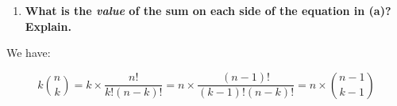 \documentclass[10pt]{article}
\begin{document}
\begin{enumerate}
\begin{enumerate}
\begin{proof}
Then we have $\binom{n}{k} = 0$ with $k > n$, so we can conclude that:

\begin{align*}
      2\binom{n}{2} +  4\binom{n}{4} + \ldots + (n-2)\binom{n}{n-2} + (n)\binom{n}{n} + (n+2)\binom{n}{n+2} + (n+4)\binom{n}{n+4} + \ldots 
      & \\= \binom{n}{1} + 3\binom{n}{3} + \ldots + (n-3)\binom{n}{n-3} + (n-1)\binom{n}{n-1} + (n+1)\binom{n}{n+1} + (n+3)\binom{n}{n+3} + \ldots
\end{align*}

If $n \geq 2, n \equiv 1 \pmod 2$, let $n = 2k + 1$ with $k \in \mathbb{N}^*$. Then from $(1)$, we have:

\begin{align*}
    \binom{n}{1}(-1)^{2k}  + 2\binom{n}{2}(-1)^{2k-1} + 3\binom{n}{3}(-1)^{2k-2} + \ldots + (n-2)\binom{n}{n-1} - (n-1)\binom{n}{n-1} + n\binom{n}{n} &= 0 \\
    \binom{n}{1} - 2\binom{n}{2} + 3\binom{n}{3} -  4\binom{n}{4} + \ldots + (n-2)\binom{n}{n-1} - (n-1)\binom{n}{n-1} + n\binom{n}{n} &= 0 \\
      2\binom{n}{2} +  4\binom{n}{4} + \ldots + (n-3)\binom{n}{n-3} + (n-1)\binom{n}{n-1} = \binom{n}{1} + 3\binom{n}{3} + \ldots + (n-2)\binom{n}{n-2} + n\binom{n}{n}
\end{align*}

Then we have $\binom{n}{k} = 0$ with $k > n$, so we can conclude that:

\begin{align*}
      2\binom{n}{2} +  4\binom{n}{4} + \ldots + (n-3)\binom{n}{n-3} + (n-1)\binom{n}{n-1} + (n+1)\binom{n}{n+1} + (n+3)\binom{n}{n+3} + \ldots 
      & \\= \binom{n}{1} + 3\binom{n}{3} + \ldots + (n-2)\binom{n}{n-2} + (n)\binom{n}{n} + (n+2)\binom{n}{n+2} + \ldots
\end{align*}

Therefore, we can conclude that with every $n \geq 2$:

$$\binom{n}{1}+3\binom{n}{3}+5\binom{n}{5}+\cdots \, = \, 2\binom{n}{2}+4\binom{n}{4}+6\binom{n}{6}+\cdots$$

\end{proof}
\item
\textbf{What is the {\it value} of the sum on each side of the equation in (a)?  Explain.}
\end{enumerate}

We have: 

$$k\binom{n}{k} = k \times \frac{n!}{k!(n-k)!}=n \times \frac{(n-1)!}{(k-1)!(n-k)!} = n\times\binom{n-1}{k-1}$$


\end{enumerate}
\end{document}

